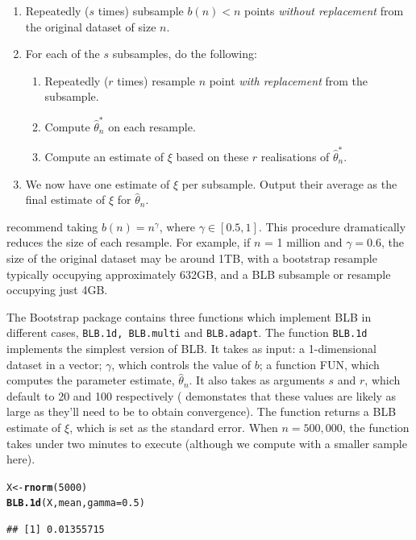\documentclass{article}\usepackage[]{graphicx}\usepackage[]{color}
\makeatletter
\newcommand{\hlnum}[1]{\textcolor[rgb]{0.686,0.059,0.569}{#1}}%
\newcommand{\hlstd}[1]{\textcolor[rgb]{0.345,0.345,0.345}{#1}}%
\newcommand{\hlkwb}[1]{\textcolor[rgb]{0.69,0.353,0.396}{#1}}%
\newcommand{\hlkwc}[1]{\textcolor[rgb]{0.333,0.667,0.333}{#1}}%
\newcommand{\hlkwd}[1]{\textcolor[rgb]{0.737,0.353,0.396}{\textbf{#1}}}%
\newenvironment{kframe}{%
 \def\at@end@of@kframe{}%
 \ifinner\ifhmode%
  \def\at@end@of@kframe{\end{minipage}}%
  \begin{minipage}{\columnwidth}%
 \fi\fi%
 \def\FrameCommand##1{\hskip\@totalleftmargin \hskip-\fboxsep
 \colorbox{shadecolor}{##1}\hskip-\fboxsep
     \hskip-\linewidth \hskip-\@totalleftmargin \hskip\columnwidth}%
 \MakeFramed {\advance\hsize-\width
   \@totalleftmargin\z@ \linewidth\hsize
   \@setminipage}}%
 {\par\unskip\endMakeFramed%
 \at@end@of@kframe}
\newenvironment{knitrout}{}{} %
\makeatother
\begin{document}
\begin{enumerate}
\item Repeatedly ($s$ times) subsample $b(n) < n$ points \emph{without replacement} from the original dataset of size $n$.
\item For each of the $s$ subsamples, do the following:
\begin{enumerate}
\item Repeatedly ($r$ times) resample $n$ point \emph{with replacement} from the subsample.
\item Compute $\hat\theta_n^*$ on each resample.
\item Compute an estimate of $\xi$ based on these $r$ realisations of $\hat\theta_n^*$.
\end{enumerate}
\item We now have one estimate of $\xi$ per subsample. Output their average as the final estimate of $\xi$ for $\hat\theta_n$.
\end{enumerate}


\textcite{Kleiner2014} recommend taking $b(n) = n^{\gamma}$, where $\gamma \in [0.5,1]$. This procedure dramatically reduces the size of each resample. For example, if $n$ = 1 million and $\gamma=0.6$, the size of the original dataset may be around 1TB, with a bootstrap resample typically occupying approximately 632GB, and a BLB subsample or resample occupying just 4GB.

The Bootstrap package contains three functions which implement BLB in different cases, \texttt{BLB.1d, BLB.multi} and \texttt{BLB.adapt}. The function \texttt{BLB.1d} implements the simplest version of BLB. It takes as input: a 1-dimensional dataset in a vector; $\gamma$, which controls the value of $b$; a function FUN, which computes the parameter estimate, $\hat\theta_n$. It also takes as arguments $s$ and $r$, which default to 20 and 100 respectively (\textcite{Kleiner2014} demonstates that these values are likely as large as they'll need to be to obtain convergence). The function returns a BLB estimate of $\xi$, which is set as the standard error. When $n=500,000$, the function takes under two minutes to execute (although we compute with a smaller sample here).

\begin{knitrout}
\color{fgcolor}\begin{kframe}
\begin{alltt}
\hlstd{X} \hlkwb{<-} \hlkwd{rnorm}\hlstd{(}\hlnum{5000}\hlstd{)}
\hlkwd{BLB.1d}\hlstd{(X, mean,} \hlkwc{gamma}\hlstd{=}\hlnum{0.5}\hlstd{)}
\end{alltt}
\begin{verbatim}
## [1] 0.01355715
\end{verbatim}
\end{kframe}
\end{knitrout}
\end{document}
